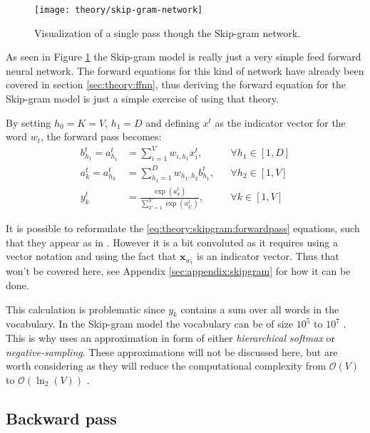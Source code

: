 \begin{figure}[H]
	\centering
	\texttt{[image: theory/skip-gram-network]}
	\caption{Visualization of a single pass though the Skip-gram network.}
	\label{fig:theory:skipgram:network}
\end{figure}

As seen in Figure \ref{fig:theory:skipgram:network} the Skip-gram model is really just a very simple feed forward neural network. The forward equations for this kind of network have already been covered in section \ref{sec:theory:ffnn}, thus deriving the forward equation for the Skip-gram model is just a simple exercise of using that theory. 

By setting $h_0 = K = V$, $h_1 = D$ and defining $x^t$ as the indicator vector for the word $w_t$, the forward pass becomes:
\begin{equation}
\begin{aligned}
b_{h_1}^t = a_{h_1}^t &= \sum_{i = 1}^V w_{i, h_1} x_i^t, && \forall h_1 \in [1, D] \\
a_{k}^t = a_{h_2}^t &= \sum_{h_1 = 1}^{D} w_{h_1, h_2} b_{h_1}^t, && \forall h_2 \in [1, V] \\
y_k^t &= \frac{\exp(a_k^t)}{\sum_{k'=1}^V \exp(a_{k'}^t)}, && \forall k \in [1, V]
\end{aligned}
\label{eq:theory:skipgram:forwardpass}
\end{equation}

It is possible to reformulate the \eqref{eq:theory:skipgram:forwardpass} equations, such that they appear as in \cite{word2vec-details}. However it is a bit convoluted as it requires using a vector notation and using the fact that $\mathbf{x}_{w_t}$ is an indicator vector. Thus that won't be covered here, see Appendix \ref{sec:appendix:skipgram} for how it can be done.

This calculation is problematic since $y_k$ contains a sum over all words in the vocabulary. In the Skip-gram model the vocabulary can be of size $10^5$ to $10^7$ \cite{word2vec-details}. This is why \cite{word2vec-comparing, word2vec-details, word2vec-explained} uses an approximation in form of either \textit{hierarchical softmax} or \textit{negative-sampling}. These approximations will not be discussed here, but are worth considering as they will reduce the computational complexity from $\mathcal{O}(V)$ to $\mathcal{O}(\ln_2(V))$ \cite{word2vec-comparing}.

\subsection{Backward pass}

